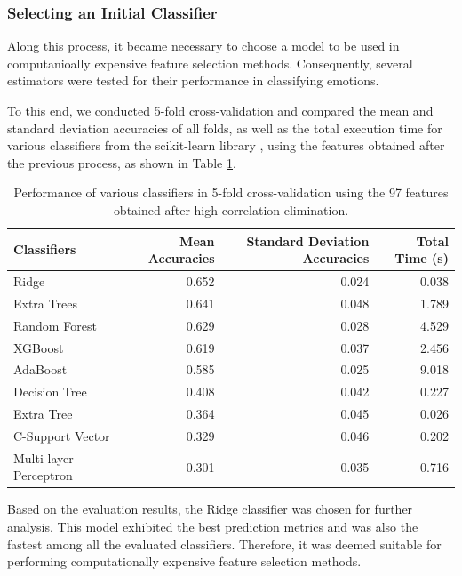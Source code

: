 \subsubsection{Selecting an Initial Classifier}

Along this process, it became necessary to choose a model to be used in computanioally expensive feature selection methods. Consequently, several estimators were tested for their performance in classifying emotions.

To this end, we conducted 5-fold cross-validation and compared the mean and standard deviation accuracies of all folds, as well as the total execution time for various classifiers from the scikit-learn library \cite{pedregosa2011scikit}, using the features obtained after the previous process, as shown in Table \ref{tab:modelsPerformance}.

\begin{table}[H]
	\caption{Performance of various classifiers in 5-fold cross-validation using the 97 features obtained after high correlation elimination.}
	\centering
	\label{tab:modelsPerformance}
	\begin{tabular}{lrrr}
		\toprule
		Classifiers &   Mean Accuracies &   Standard Deviation Accuracies & Total Time (s)\\
		\midrule
		Ridge   &        0.652 &      0.024 & 0.038 \\
		Extra Trees   &        0.641 &      0.048 & 1.789 \\
		Random Forest &        0.629 &      0.028 & 4.529 \\
		XGBoost     &        0.619 &      0.037 & 2.456 \\
		AdaBoost   &        0.585 &      0.025 & 9.018 \\
		Decision Tree &        0.408 &      0.042 & 0.227 \\
		Extra Tree  &        0.364 &      0.045 & 0.026 \\
		C-Support Vector  &        0.329 &      0.046 & 0.202 \\
		Multi-layer Perceptron    &        0.301 &      0.035 & 0.716 \\
		\bottomrule
	\end{tabular}
\end{table}

Based on the evaluation results, the Ridge classifier was chosen for further analysis. This model exhibited the best prediction metrics and was also the fastest among all the evaluated classifiers. Therefore, it was deemed suitable for performing computationally expensive feature selection methods.


